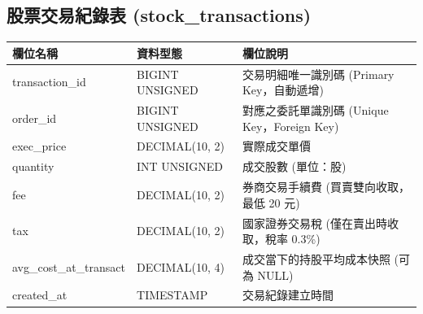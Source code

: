 \documentclass[UTF8, a4paper, 12pt, fontset=none]{ctexart}
\begin{document}
    \subsection{股票交易紀錄表 (stock\_transactions)}
    
    \begin{center}
    \begin{tabular}{|l|l|p{6cm}|}
    \hline
    \textbf{欄位名稱} & \textbf{資料型態} & \textbf{欄位說明} \\ \hline
    transaction\_id & BIGINT UNSIGNED & 交易明細唯一識別碼 (Primary Key，自動遞增) \\ \hline
    order\_id & BIGINT UNSIGNED & 對應之委託單識別碼 (Unique Key，Foreign Key) \\ \hline
    exec\_price & DECIMAL(10, 2) & 實際成交單價 \\ \hline
    quantity & INT UNSIGNED & 成交股數 (單位：股) \\ \hline
    fee & DECIMAL(10, 2) & 券商交易手續費 (買賣雙向收取，最低 20 元) \\ \hline
    tax & DECIMAL(10, 2) & 國家證券交易稅 (僅在賣出時收取，稅率 0.3\%) \\ \hline
    avg\_cost\_at\_transact & DECIMAL(10, 4) & 成交當下的持股平均成本快照 (可為 NULL) \\ \hline
    created\_at & TIMESTAMP & 交易紀錄建立時間 \\ \hline
    \end{tabular}
    \end{center}
\end{document}
